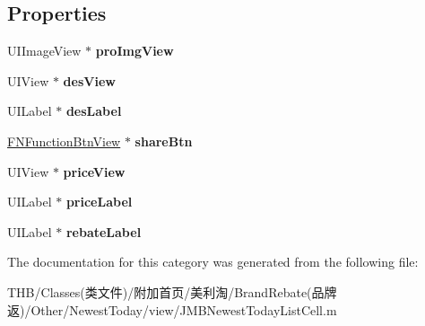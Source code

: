 \subsection*{Properties}
\begin{DoxyCompactItemize}
\item 
\mbox{\label{category_j_m_b_newest_today_list_cell_07_08_a553b99519d2bf82c49b01ae4503fe279}} 
U\+I\+Image\+View $\ast$ {\bfseries pro\+Img\+View}
\item 
\mbox{\label{category_j_m_b_newest_today_list_cell_07_08_ad652799d4ebf79751c41d7413138b558}} 
U\+I\+View $\ast$ {\bfseries des\+View}
\item 
\mbox{\label{category_j_m_b_newest_today_list_cell_07_08_a7d94caad62f9e651733e59a8ba4ad866}} 
U\+I\+Label $\ast$ {\bfseries des\+Label}
\item 
\mbox{\label{category_j_m_b_newest_today_list_cell_07_08_a6a7bb53b184b7c0f199e1c75768a7ec1}} 
\mbox{\hyperlink{interface_f_n_function_btn_view}{F\+N\+Function\+Btn\+View}} $\ast$ {\bfseries share\+Btn}
\item 
\mbox{\label{category_j_m_b_newest_today_list_cell_07_08_a6ae76dac79f03a1e42374ab5832a796a}} 
U\+I\+View $\ast$ {\bfseries price\+View}
\item 
\mbox{\label{category_j_m_b_newest_today_list_cell_07_08_a51ad82f9b8986429271d57d7c99f019c}} 
U\+I\+Label $\ast$ {\bfseries price\+Label}
\item 
\mbox{\label{category_j_m_b_newest_today_list_cell_07_08_a0db7e20b931f5b183fcaf5c80dd6d55b}} 
U\+I\+Label $\ast$ {\bfseries rebate\+Label}
\end{DoxyCompactItemize}


The documentation for this category was generated from the following file\+:\begin{DoxyCompactItemize}
\item 
T\+H\+B/\+Classes(类文件)/附加首页/美利淘/\+Brand\+Rebate(品牌返)/\+Other/\+Newest\+Today/view/J\+M\+B\+Newest\+Today\+List\+Cell.\+m\end{DoxyCompactItemize}
